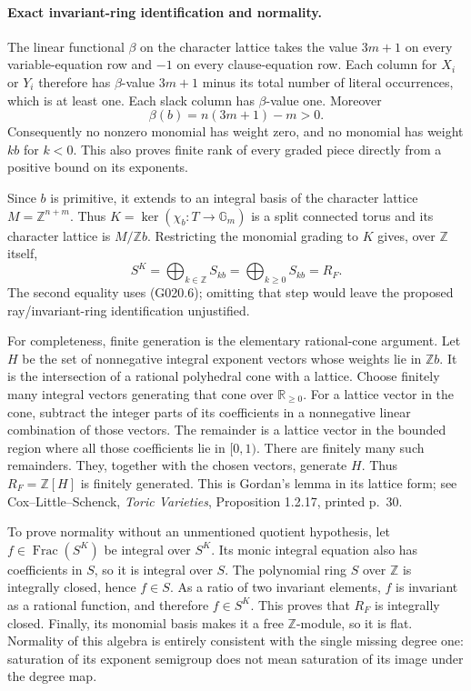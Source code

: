 \paragraph{Exact invariant-ring identification and normality.}
The linear functional $\beta$ on the character lattice takes the
value $3m+1$ on every variable-equation row and $-1$ on every
clause-equation row. Each column for $X_i$ or $Y_i$ therefore has
$\beta$-value $3m+1$ minus its total number of literal occurrences,
which is at least one. Each slack column has $\beta$-value one.
Moreover
\[
 \beta(b)=n(3m+1)-m>0.
 \tag{G020.6}
\]
Consequently no nonzero monomial has weight zero, and no monomial
has weight $kb$ for $k<0$. This also proves finite rank of every
graded piece directly from a positive bound on its exponents.

Since $b$ is primitive, it extends to an integral basis of the
character lattice $M=\mathbb Z^{n+m}$. Thus
$K=\ker(\chi_b:T\to\mathbb G_m)$ is a split connected torus and
its character lattice is $M/\mathbb Zb$. Restricting the monomial
grading to $K$ gives, over $\mathbb Z$ itself,
\[
 S^K=\bigoplus_{k\in\mathbb Z}S_{kb}
     =\bigoplus_{k\geq0}S_{kb}=R_F.
 \tag{G020.7}
\]
The second equality uses (G020.6); omitting that step would leave
the proposed ray/invariant-ring identification unjustified.

For completeness, finite generation is the elementary rational-cone
argument. Let $H$ be the set of nonnegative integral exponent vectors
whose weights lie in $\mathbb Zb$. It is the intersection of a
rational polyhedral cone with a lattice. Choose finitely many
integral vectors generating that cone over $\mathbb R_{\geq0}$.
For a lattice vector in the cone, subtract the integer parts of
its coefficients in a nonnegative linear combination of those
vectors. The remainder is a lattice vector in the bounded region
where all those coefficients lie in $[0,1)$. There are finitely
many such remainders. They, together with the chosen vectors,
generate $H$. Thus $R_F=\mathbb Z[H]$ is finitely generated.
This is Gordan's lemma in its lattice form; see Cox--Little--Schenck,
\emph{Toric Varieties}, Proposition 1.2.17, printed p.~30.

To prove normality without an unmentioned quotient hypothesis,
let $f\in\operatorname{Frac}(S^K)$ be integral over $S^K$.
Its monic integral equation also has coefficients in $S$, so it
is integral over $S$. The polynomial ring $S$ over $\mathbb Z$
is integrally closed, hence $f\in S$. As a ratio of two invariant
elements, $f$ is invariant as a rational function, and therefore
$f\in S^K$. This proves that $R_F$ is integrally closed. Finally,
its monomial basis makes it a free $\mathbb Z$-module, so it is
flat. Normality of this algebra is entirely consistent with the
single missing degree one: saturation of its exponent semigroup
does not mean saturation of its image under the degree map.

